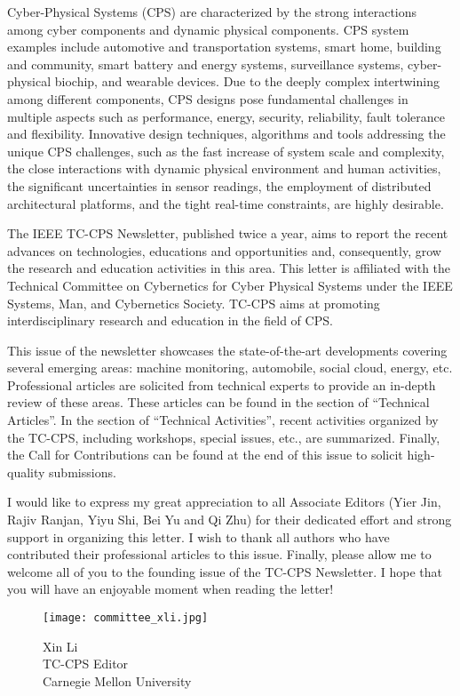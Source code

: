 
Cyber-Physical Systems (CPS) are characterized by the strong interactions among cyber components and dynamic physical components.
CPS system examples include automotive and transportation systems, smart home, building and community,
smart battery and energy systems, surveillance systems, cyber-physical biochip, and wearable devices.
Due to the deeply complex intertwining among different components, CPS designs pose fundamental challenges in multiple aspects such as performance,
energy, security, reliability, fault tolerance and flexibility.
Innovative design techniques, algorithms and tools addressing the unique CPS challenges, such as the fast increase of system scale and complexity,
the close interactions with dynamic physical environment and human activities, the significant uncertainties in sensor readings,
the employment of distributed architectural platforms, and the tight real-time constraints, are highly desirable.

The IEEE TC-CPS Newsletter, published twice a year, aims to report the recent advances on technologies, educations and opportunities and, consequently,
grow the research and education activities in this area.
This letter is affiliated with the Technical Committee on Cybernetics for Cyber Physical Systems under the IEEE Systems, Man, and Cybernetics Society.
TC-CPS aims at promoting interdisciplinary research and education in the field of CPS.

This issue of the newsletter showcases the state-of-the-art developments covering several emerging areas:
machine monitoring, automobile, social cloud, energy, etc.
Professional articles are solicited from technical experts to provide an in-depth review of these areas.
These articles can be found in the section of ``Technical Articles''.
In the section of ``Technical Activities'', recent activities organized by the TC-CPS, including workshops, special issues, etc., are summarized.
Finally, the Call for Contributions can be found at the end of this issue to solicit high-quality submissions.

I would like to express my great appreciation to all Associate Editors (Yier Jin, Rajiv Ranjan, Yiyu Shi, Bei Yu and Qi Zhu) for their dedicated effort and strong support in organizing this letter.
I wish to thank all authors who have contributed their professional articles to this issue.
Finally, please allow me to welcome all of you to the founding issue of the TC-CPS Newsletter.
I hope that you will have an enjoyable moment when reading the letter!

\vspace{.2in}
\begin{figure}[h]
\begin{minipage}{.3\textwidth}
\texttt{[image: committee\_xli.jpg]}
\caption*{Xin Li \\ TC-CPS Editor \\ Carnegie Mellon University}
\end{minipage}
\end{figure}

